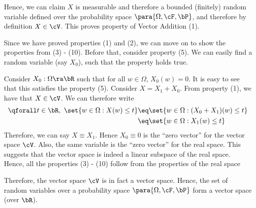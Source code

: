 \documentclass[a4paper,10pt]{article}
\begin{document}
\begin{question}
	Hence, we can claim $X$ is measurable and therefore a bounded (finitely) random variable defined over the probability space $\para{\Omega, \cF, \bP}$, and therefore by definition $X \in \cV$. This proves property of Vector Addition (1).

	Since we have proved properties (1) and (2), we can move on to show the properties from (3) - (10).
	Before that, consider property (5).
	We can easily find a random variable (say $X_0$), such that the property holds true.

	Consider $X_0 : \Omega \ra \bR$ such that for all $w \in \Omega$, $X_0(w) = 0$.
	It is easy to see that this satisfies the property (5).
	Consider $X = X_1 + X_0$.
	From property (1), we have that $X \in \cV$.
	We can therefore write
	\begin{align*}
		\qforall t \in \bR,\ \set{w \in \Omega: X(w) \le t}	&\eq	\set{w \in \Omega: (X_0 + X_1)(w) \le t} \\
										&\eq	\set{w \in \Omega: X_1(w) \le t}
	\end{align*}
	Therefore, we can say $X \equiv X_1$. Hence $X_0 \equiv 0$ is the ``zero vector'' for the vector space $\cV$. Also, the same variable is the ``zero vector'' for the real space.
	This suggests that the vector space is indeed a linear subspace of the real space.
	Hence, all the properties (3) - (10) follow from the properties of the real space \citep{}

	Therefore, the vector space $\cV$ is in fact a vector space.
	Hence, the set of random variables over a probability space $\para{\Omega, \cF, \bP}$ form a vector space (over $\bR$).

\end{question}
\end{document}
